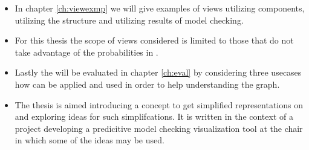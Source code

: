 \documentclass[preview]{standalone}
\begin{document}
\begin{itemize}
	\item  In chapter \ref{ch:viewexmp} we will give examples of views utilizing \chgphN components, \viewsN utilizing the \chgphN structure and \viewsN utilizing results of model checking.
	\item For this thesis the scope of views considered is limited to those that do not take advantage of the probabilities in \chgphsN.
	\item Lastly the \viewsN will be evaluated in chapter \ref{ch:eval} by considering three usecases how \viewsN can be applied and used in order to help understanding the graph.
	\item The thesis is aimed introducing a concept to get simplified representations on \chgphsN and exploring ideas for such simplifcations. It is written in the context of a project developing a predicitive model checking visualization tool at the chair in which some of the ideas may be used.
	
\end{itemize}
\end{document}
